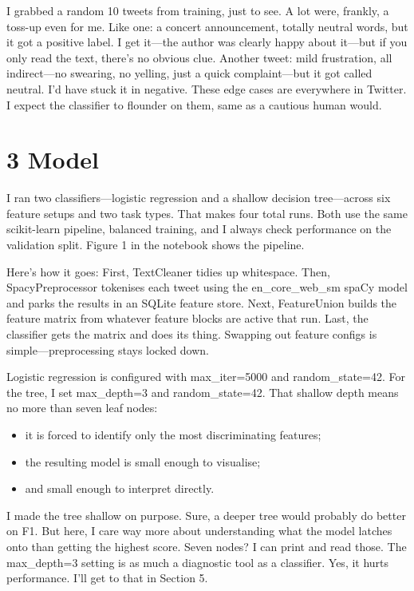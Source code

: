 \documentclass[12pt]{article}
\begin{document}
I grabbed a random 10 tweets from training, just to see. A lot were, frankly, a toss-up even for me. Like one: a concert announcement, totally neutral words, but it got a positive label. I get it---the author was clearly happy about it---but if you only read the text, there's no obvious clue. Another tweet: mild frustration, all indirect---no swearing, no yelling, just a quick complaint---but it got called neutral. I'd have stuck it in negative. These edge cases are everywhere in Twitter. I expect the classifier to flounder on them, same as a cautious human would.



\section*{3 Model}



I ran two classifiers---logistic regression and a shallow decision tree---across six feature setups and two task types. That makes four total runs. Both use the same scikit-learn pipeline, balanced training, and I always check performance on the validation split. Figure 1 in the notebook shows the pipeline.

Here's how it goes: First, TextCleaner tidies up whitespace. Then, SpacyPreprocessor tokenises each tweet using the en\_core\_web\_sm spaCy model and parks the results in an SQLite feature store. Next, FeatureUnion builds the feature matrix from whatever feature blocks are active that run. Last, the classifier gets the matrix and does its thing. Swapping out feature configs is simple---preprocessing stays locked down.

Logistic regression is configured with max\_iter=5000 and random\_state=42. For the tree, I set max\_depth=3 and random\_state=42. That shallow depth means no more than seven leaf nodes:

\begin{itemize}

  \item it is forced to identify only the most discriminating features;

  \item the resulting model is small enough to visualise;

  \item and small enough to interpret directly.

\end{itemize}

I made the tree shallow on purpose. Sure, a deeper tree would probably do better on F1. But here, I care way more about understanding what the model latches onto than getting the highest score. Seven nodes? I can print and read those. The max\_depth=3 setting is as much a diagnostic tool as a classifier. Yes, it hurts performance. I'll get to that in Section 5.
\end{document}
